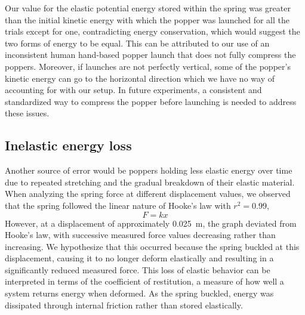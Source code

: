 \documentclass[reprint,amsmath,amssymb,aps,twoside]{revtex4-2} %
\begin{document}
Our value for the elastic potential energy stored within the spring was greater than the initial kinetic energy with which the popper was launched for all the trials except for one, contradicting energy conservation, which would suggest the two forms of energy to be equal. This can be attributed to our use of an inconsistent human hand-based popper launch that does not fully compress the poppers. Moreover, if launches are not perfectly vertical, some of the popper's kinetic energy can go to the horizontal direction which we have no way of accounting for with our setup. In future experiments, a consistent and standardized way to compress the popper before launching is needed to address these issues.

\subsection{Inelastic energy loss}
Another source of error would be poppers holding less elastic energy over time due to repeated stretching and the gradual breakdown of their elastic material. When analyzing the spring force at different displacement values, we observed that the spring followed the linear nature of Hooke's law \cite{tipler} with $r^2 = 0.99$, 
\begin{equation}
F = kx
\end{equation}
However, at a displacement of approximately \qty{0.025}{\meter}, the graph deviated from Hooke’s law, with successive measured force values decreasing rather than increasing. We hypothesize that this occurred because the spring buckled at this displacement, causing it to no longer deform elastically and resulting in a significantly reduced measured force. This loss of elastic behavior can be interpreted in terms of the coefficient of restitution, a measure of how well a system returns energy when deformed. As the spring buckled, energy was dissipated through internal friction rather than stored elastically. 
\end{document}
